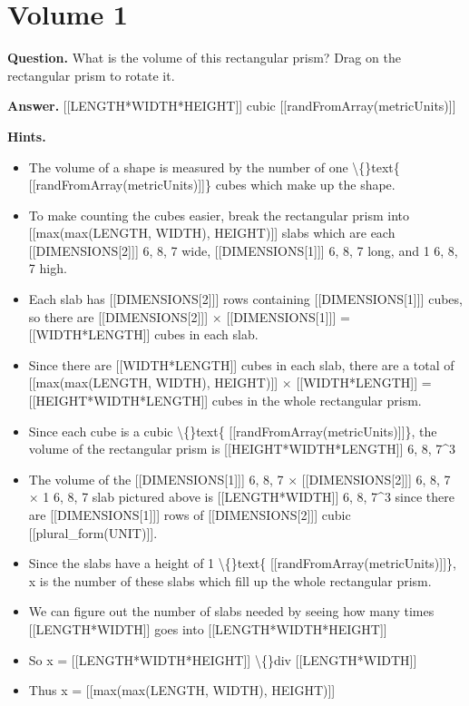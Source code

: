 \documentclass{article}
\begin{document}
\section*{Volume 1}
\textbf{Question.} What is the volume of this rectangular prism? Drag on the rectangular prism to rotate it.

\textbf{Answer.} [[LENGTH*WIDTH*HEIGHT]] cubic [[randFromArray(metricUnits)]]

\textbf{Hints.}
\begin{itemize}
  \item The volume of a shape is measured by the number of one \textbackslash\{\}text\{ [[randFromArray(metricUnits)]]\} cubes which make up the shape.
  \item To make counting the cubes easier, break the rectangular prism into [[max(max(LENGTH, WIDTH), HEIGHT)]] slabs which are each
                    [[DIMENSIONS[2]]] 6, 8, 7 wide,  [[DIMENSIONS[1]]] 6, 8, 7 long, and
                    1 6, 8, 7 high.
  \item Each slab has [[DIMENSIONS[2]]] rows containing [[DIMENSIONS[1]]] cubes, so there are
                       [[DIMENSIONS[2]]] $\times$ [[DIMENSIONS[1]]] = [[WIDTH*LENGTH]] cubes in each slab.
  \item Since there are [[WIDTH*LENGTH]] cubes in each slab, there are a total of
                [[max(max(LENGTH, WIDTH), HEIGHT)]] $\times$ [[WIDTH*LENGTH]] = [[HEIGHT*WIDTH*LENGTH]] cubes in the whole rectangular prism.
  \item Since each cube is a cubic \textbackslash\{\}text\{ [[randFromArray(metricUnits)]]\}, the volume of the rectangular prism is [[HEIGHT*WIDTH*LENGTH]] 6, 8, 7\textasciicircum{}3
  \item The volume of the 
                            [[DIMENSIONS[1]]] 6, 8, 7 $\times$
                            [[DIMENSIONS[2]]] 6, 8, 7 $\times$
                            1 6, 8, 7
                         slab pictured above is 
                            [[LENGTH*WIDTH]] 6, 8, 7\textasciicircum{}3
                         since there are
                        [[DIMENSIONS[1]]] rows of
                        [[DIMENSIONS[2]]] cubic
                        [[plural\_form(UNIT)]].
  \item Since the slabs have a height of 1 \textbackslash\{\}text\{ [[randFromArray(metricUnits)]]\}, x is the number of these slabs which fill up the whole rectangular prism.
  \item We can figure out the number of slabs needed by seeing how many times [[LENGTH*WIDTH]]
                     goes into [[LENGTH*WIDTH*HEIGHT]]
  \item So x = [[LENGTH*WIDTH*HEIGHT]] \textbackslash\{\}div [[LENGTH*WIDTH]]
  \item Thus x = [[max(max(LENGTH, WIDTH), HEIGHT)]]
\end{itemize}
\end{document}
